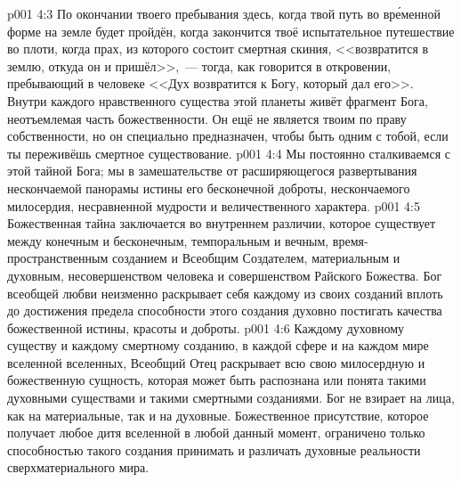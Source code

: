 \vs p001 4:3 По окончании твоего пребывания здесь, когда твой путь во вр\'еменной форме на земле будет пройдён, когда закончится твоё испытательное путешествие во плоти, когда прах, из которого состоит смертная скиния, <<возвратится в землю, откуда он и пришёл>>,~--- тогда, как говорится в откровении, пребывающий в человеке <<Дух возвратится к Богу, который дал его>>. Внутри каждого нравственного существа этой планеты живёт фрагмент Бога, неотъемлемая часть божественности. Он ещё не является твоим по праву собственности, но он специально предназначен, чтобы быть одним с тобой, если ты переживёшь смертное существование.
\vs p001 4:4 \pc Мы постоянно сталкиваемся с этой тайной Бога; мы в замешательстве от расширяющегося развертывания нескончаемой панорамы истины его бесконечной доброты, нескончаемого милосердия, несравненной мудрости и величественного характера.
\vs p001 4:5 \pc Божественная тайна заключается во внутреннем различии, которое существует между конечным и бесконечным, темпоральным и вечным, время\hyp{}пространственным созданием и Всеобщим Создателем, материальным и духовным, несовершенством человека и совершенством Райского Божества. Бог всеобщей любви неизменно раскрывает себя каждому из своих созданий вплоть до достижения предела способности этого создания духовно постигать качества божественной истины, красоты и доброты.
\vs p001 4:6 Каждому духовному существу и каждому смертному созданию, в каждой сфере и на каждом мире вселенной вселенных, Всеобщий Отец раскрывает всю свою милосердную и божественную сущность, которая может быть распознана или понята такими духовными существами и такими смертными созданиями. Бог не взирает на лица, как на материальные, так и на духовные. Божественное присутствие, которое получает любое дитя вселенной в любой данный момент, ограничено только способностью такого создания принимать и различать духовные реальности сверхматериального мира.
